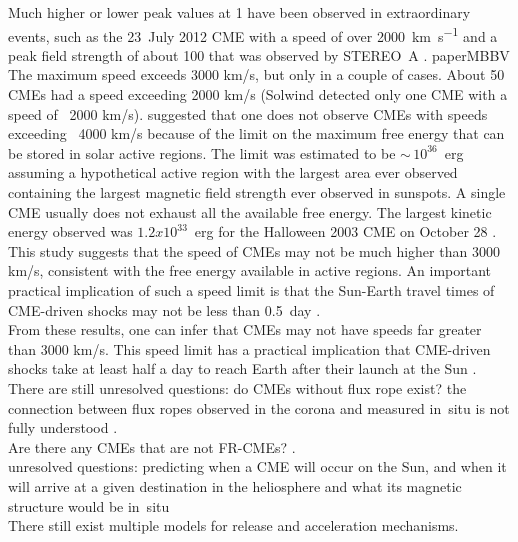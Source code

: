 Much higher or lower peak values at \SI{1}{\au} have been observed in extraordinary events, such as the 23~July 2012 CME with a speed of over \SI{2000}{\km\per\s} and a peak field strength of about \SI{100}{\nT} that was observed by STEREO~A \citep{Russell2013}. paperMBBV\\
The maximum speed exceeds 3000 km/s, but only in a couple of cases. About 50 CMEs had a speed exceeding 2000 km/s (Solwind detected only one CME with a speed of ~2000 km/s). \citet{Gopalswamy2010} suggested that one does not observe CMEs with speeds exceeding ~4000 km/s because of the limit on the maximum free energy that can be stored in solar active regions. The limit was estimated to be $\sim\,10^{36}$~erg assuming a hypothetical active region with the largest area ever observed containing the largest magnetic field strength ever observed in sunspots. A single CME usually does not exhaust all the available free energy. The largest kinetic energy observed was $1.2x10^{33}$~erg for the Halloween 2003 CME on October 28 \citep{Gopalswamy2005}.\\
This study suggests that the speed of CMEs may not be much higher than 3000 km/s, consistent with the free energy available in active regions. An important practical implication of such a speed limit is that the Sun-Earth travel times of CME-driven shocks may not be less than 0.5~day \citep{Gopalswamy2005}.\\
From these results, one can infer that CMEs may not have speeds far greater than 3000 km/s. This speed limit has a practical implication that CME-driven shocks take at least half a day to reach Earth after their launch at the Sun \citep{Gopalswamy2005}.\\ 


There are still unresolved questions: do CMEs without flux rope exist? the connection between flux ropes observed in the corona and measured in~situ is not fully understood \citep{Vourlidas2014}.\\
Are there any CMEs that are not FR-CMEs? \citep{Vourlidas2013}.\\
unresolved questions: predicting when a CME will occur on the Sun, and when it will arrive at a given destination in the heliosphere and what its magnetic structure would be in~situ \citep{Gopalswamy2016}\\
There still exist multiple models for release and acceleration mechanisms.\\


